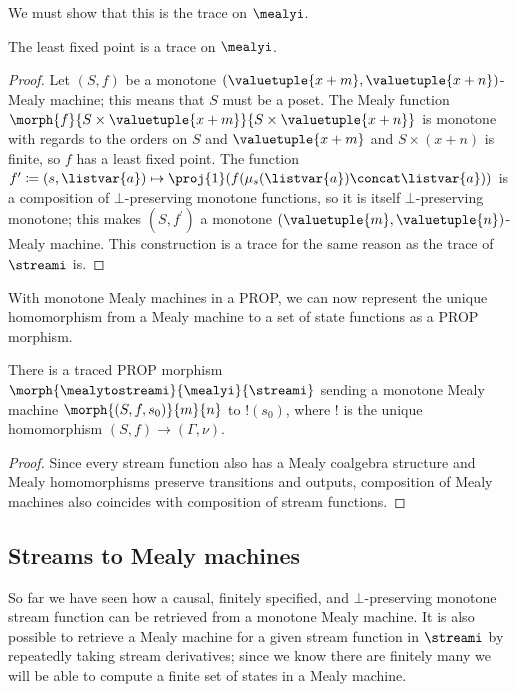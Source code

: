 \documentclass{lmcs}
\begin{document}
We must show that this is the trace on \(\mealyi\).

\begin{prop}
    The least fixed point is a trace on \(\mealyi\).
\end{prop}
\begin{proof}
    Let \((S, f)\) be a monotone
    \((\valuetuple{x+m}, \valuetuple{x+n})\)-Mealy machine; this means that
    \(S\) must be a poset.
    The Mealy function \(
    \morph{f}{
        S \times \valuetuple{x+m}
    }{
        S \times \valuetuple{x+n}
    }
    \) is monotone with regards to the orders on \(S\) and
    \(\valuetuple{x+m}\) and \(S \times (x+n)\) is finite, so
    \(f\) has a least fixed point.
    The function \(
    f^\prime \coloneqq (s, \listvar{a})
    \mapsto
    \proj{1}\mleft(f(\mu_{s}(\listvar{a}) \concat \listvar{a})\mright)
    \) is a composition of \(\bot\)-preserving monotone functions, so it is
    itself \(\bot\)-preserving monotone; this makes \((S, f^\prime)\) a monotone
    \((\valuetuple{m}, \valuetuple{n})\)-Mealy machine.
    This construction is a trace for the same reason as the trace of
    \(\streami\) is.
\end{proof}

With monotone Mealy machines in a PROP, we can now represent the unique
homomorphism from a Mealy machine to a set of state functions as a PROP
morphism.

\begin{prop}\label{prop:mealy-to-stream}
    There is a traced PROP morphism
    \(\morph{\mealytostreami}{\mealyi}{\streami}\) sending a monotone Mealy
    machine \(\morph{\left(S, f, s_0\right)}{m}{n}\) to \(!(s_0)\), where \(!\)
    is the unique homomorphism \((S,f) \to (\Gamma,\nu)\).
\end{prop}
\begin{proof}
    Since every stream function also has a Mealy coalgebra structure and Mealy
    homomorphisms preserve transitions and outputs,
    composition of Mealy machines also coincides with composition of stream
    functions.
\end{proof}

\subsection{Streams to Mealy machines}

So far we have seen how a causal, finitely specified, and \(\bot\)-preserving
monotone stream function can be retrieved from a monotone Mealy machine.
It is also possible to retrieve a Mealy machine for a given stream function in
\(\streami\) by repeatedly taking stream derivatives; since we know there are
finitely many we will be able to compute a finite set of states in a Mealy
machine.
\end{document}
